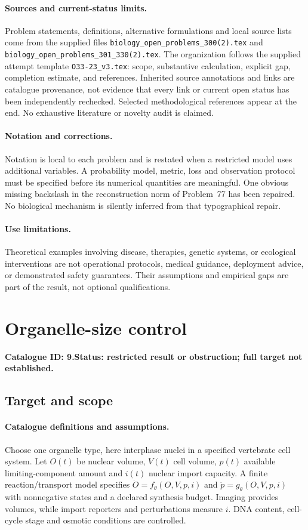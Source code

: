 \documentclass[11pt]{article}
\begin{document}
\paragraph{Sources and current-status limits.}
Problem statements, definitions, alternative formulations and local source lists
come from the supplied files
\texttt{biology\_open\_problems\_300(2).tex} and
\texttt{biology\_open\_problems\_301\_330(2).tex}.
The organization follows the supplied attempt template
\texttt{O33-23\_v3.tex}: scope, substantive calculation, explicit gap,
completion estimate, and references. Inherited source annotations and links are
catalogue provenance, not evidence that every link or current open status has
been independently rechecked. Selected methodological references appear at the
end. No exhaustive literature or novelty audit is claimed.

\paragraph{Notation and corrections.}
Notation is local to each problem and is restated when a restricted model uses
additional variables. A probability model, metric, loss and observation protocol
must be specified before its numerical quantities are meaningful. One obvious
missing backslash in the reconstruction norm of Problem~77 has been repaired.
No biological mechanism is silently inferred from that typographical repair.

\paragraph{Use limitations.}
Theoretical examples involving disease, therapies, genetic systems, or ecological
interventions are not operational protocols, medical guidance, deployment advice,
or demonstrated safety guarantees. Their assumptions and empirical gaps are part
of the result, not optional qualifications.

\setcounter{section}{8}
\section{Organelle-size control}
\label{prob:009}
\noindent\textbf{Catalogue ID: 9.}\quad \textbf{Status: restricted result or obstruction; full target not established.}
\subsection{Target and scope}
\paragraph{Catalogue definitions and assumptions.}
Choose one organelle type, here interphase nuclei in a specified vertebrate cell system. Let $O(t)$ be nuclear volume, $V(t)$ cell volume, $p(t)$ available limiting-component amount and $i(t)$ nuclear import capacity. A finite reaction/transport model specifies $\dot O=f_\theta(O,V,p,i)$ and $\dot p=g_\theta(O,V,p,i)$ with nonnegative states and a declared synthesis budget. Imaging provides volumes, while import reporters and perturbations measure $i$. DNA content, cell-cycle stage and osmotic conditions are controlled.
\end{document}

